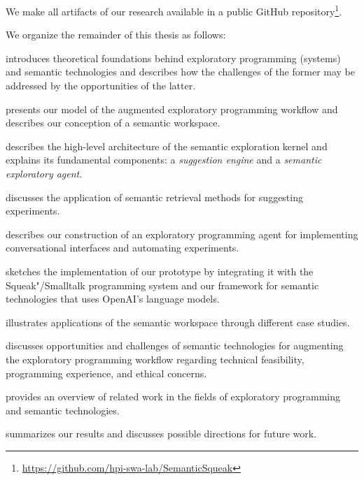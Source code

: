 We make all artifacts of our research available in a public GitHub repository\footnote{\url{https://github.com/hpi-swa-lab/SemanticSqueak}}. %

We organize the remainder of this thesis as follows:
%
\begin{description}[noextralabelsep]
	\item[\cref{cha:background}] introduces theoretical foundations behind exploratory programming (systems) and semantic technologies and describes how the challenges of the former may be addressed by the opportunities of the latter.
	\item[\cref{cha:approach}] presents our model of the augmented exploratory programming workflow and describes our conception of a semantic workspace.
	\item[\cref{cha:design}] describes the high-level architecture of the semantic exploration kernel and explains its fundamental components: a \emph{suggestion engine} and a \emph{semantic exploratory agent}.
	\item[\cref{cha:suggestions}] discusses the application of semantic retrieval methods for suggesting experiments.
	\item[\cref{cha:agent}] describes our construction of an exploratory programming agent for implementing conversational interfaces and automating experiments.
	\item[\cref{cha:implementation}] sketches the implementation of our prototype by integrating it with the Squeak"/Smalltalk programming system and our \semtex framework for semantic technologies that uses OpenAI's language models.
	\item[\cref{cha:application}] illustrates applications of the semantic workspace through different case studies.
	\item[\cref{cha:discussion}] discusses opportunities and challenges of semantic technologies for augmenting the exploratory programming workflow regarding technical feasibility, programming experience, and ethical concerns.
	\item[\cref{cha:related_work}] provides an overview of related work in the fields of exploratory programming and semantic technologies.
	\item[\cref{cha:conclusion}] summarizes our results and discusses possible directions for future work.
\end{description}
